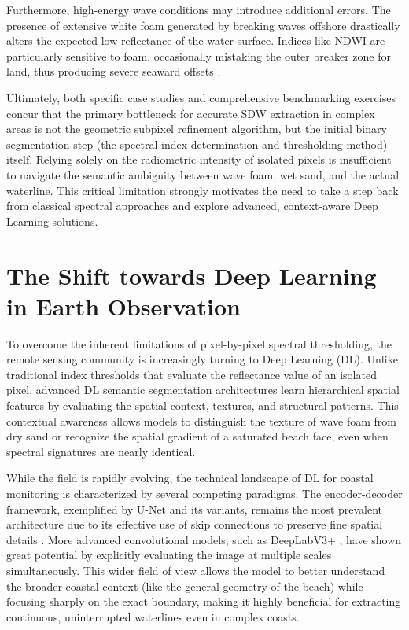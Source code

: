﻿\documentclass[ENG]{TFUOC}%
\begin{document}
Furthermore, high-energy wave conditions may introduce additional errors. The presence of extensive white foam generated by breaking waves offshore drastically alters the expected low reflectance of the water surface. Indices like NDWI are particularly sensitive to foam, occasionally mistaking the outer breaker zone for land, thus producing severe seaward offsets \citep{hagenaars_accuracy_2018, cabezas_site-specific_2026}.

Ultimately, both specific case studies \citep{cabezas_site-specific_2026, sanchez-garcia_efficient_2020} and comprehensive benchmarking exercises \citep{vos_benchmarking_2023} concur that the primary bottleneck for accurate SDW extraction in complex areas is not the geometric subpixel refinement algorithm, but the initial binary segmentation step (the spectral index determination and thresholding method) itself. Relying solely on the radiometric intensity of isolated pixels is insufficient to navigate the semantic ambiguity between wave foam, wet sand, and the actual waterline. This critical limitation strongly motivates the need to take a step back from classical spectral approaches and explore advanced, context-aware Deep Learning solutions.

\section{The Shift towards Deep Learning in Earth Observation}

To overcome the inherent limitations of pixel-by-pixel spectral thresholding, the remote sensing community is increasingly turning to Deep Learning (DL). Unlike traditional index thresholds that evaluate the reflectance value of an isolated pixel, advanced DL semantic segmentation architectures learn hierarchical spatial features by evaluating the spatial context, textures, and structural patterns. This contextual awareness allows models to distinguish the texture of wave foam from dry sand or recognize the spatial gradient of a saturated beach face, even when spectral signatures are nearly identical.

While the field is rapidly evolving, the technical landscape of DL for coastal monitoring is characterized by several competing paradigms. The encoder-decoder framework, exemplified by U-Net \citep{navab_u-net_2015} and its variants, remains the most prevalent architecture due to its effective use of skip connections to preserve fine spatial details \citep{tsiakos_use_2023}. More advanced convolutional models, such as DeepLabV3+ \citep{chen_encoder-decoder_2018}, have shown great potential by explicitly evaluating the image at multiple scales simultaneously. This wider field of view allows the model to better understand the broader coastal context (like the general geometry of the beach) while focusing sharply on the exact boundary, making it highly beneficial for extracting continuous, uninterrupted waterlines even in complex coasts.
\end{document}
